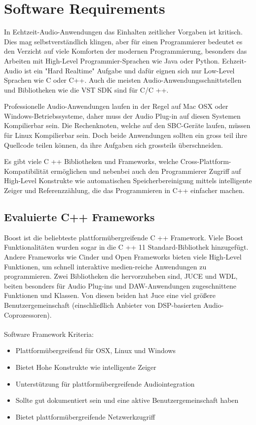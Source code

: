 \section{Software Requirements}

In Echtzeit-Audio-Anwendungen das Einhalten zeitlicher Vorgaben ist kritisch. Dies mag selbstverständlich klingen, aber für einen Programmierer bedeutet es den Verzicht auf viele Komforten der modernen Programmierung, besonders das Arbeiten mit High-Level Programmier-Sprachen wie Java oder Python. Echzeit-Audio ist ein "Hard Realtime" Aufgabe und dafür eignen sich nur Low-Level Sprachen wie C oder C++. Auch die meisten Audio-Anwendungsschnittstellen und Bibliotheken wie die VST SDK sind für C/C ++.

Professionelle Audio-Anwendungen laufen in der Regel auf Mac OSX oder Windows-Betriebssysteme, daher muss der Audio Plug-in auf diesen Systemen Kompilierbar sein. Die Rechenknoten, welche auf den SBC-Geräte laufen, müssen für Linux Kompilierbar sein. Doch beide Anwendungen sollten ein gross teil ihre Quellcode teilen können, da ihre Aufgaben sich grossteils überschneiden.

Es gibt viele C ++ Bibliotheken und Frameworks, welche Cross-Plattform-Kompatibilität ermöglichen und nebenbei  auch den Programmierer Zugriff auf High-Level Konstrukte wie  automatischen Speicherbereinigung mittels intelligente Zeiger und Referenzzählung, die das Programmieren in C++ einfacher machen.

\subsection{Evaluierte C++ Frameworks}

Boost ist die beliebteste plattformübergreifende C ++ Framework. Viele Boost Funktionalitäten wurden sogar in die C ++ 11 Standard-Bibliothek hinzugefügt. Andere Frameworks wie Cinder und Open Frameworks bieten viele High-Level Funktionen, um schnell interaktive medien-reiche Anwendungen zu programmieren. Zwei Bibliotheken die hervorzuheben sind, JUCE und WDL, beiten besonders für Audio Plug-ins und DAW-Anwendungen zugeschnittene Funktionen und Klassen. Von diesen beiden hat Juce eine viel größere Benutzergemeinschaft (einschließlich Anbieter von DSP-basierten Audio-Coprozessoren). \\
\\
\noindent
Software Framework Kriteria:

\begin{itemize}

\item Plattformübergreifend für OSX, Linux und Windows
\item Bietet Hohe Konstrukte wie intelligente Zeiger
\item Unterstützung für plattformübergreifende Audiointegration
\item Sollte gut dokumentiert sein und eine aktive Benutzergemeinschaft haben
\item Bietet plattformübergreifende Netzwerkzugriff

\end{itemize}


